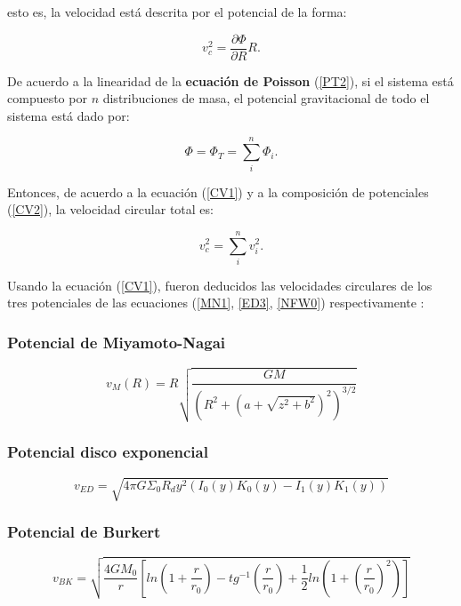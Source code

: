 esto es, la velocidad está descrita por el potencial de la forma:

\begin{equation}
\label{CV1}
v_{c}^2 = \frac{\partial \Phi}{\partial R} R.
\end{equation}

De acuerdo a la linearidad de la \textbf{ecuación de Poisson} (\ref{PT2}), si el sistema está compuesto por $n$ distribuciones de masa, el potencial gravitacional de todo el sistema está dado por:

\begin{equation}
\label{CV2}
 \Phi = \Phi_T = \sum_i^n \Phi_i.
\end{equation}

Entonces, de acuerdo a la ecuación (\ref{CV1}) y  a la composición de potenciales (\ref{CV2}), la velocidad circular total es:

\begin{equation}
\label{CV3}
v_{c}^2 = \sum_i^n v_i^2.
\end{equation}

Usando la ecuación (\ref{CV1}), fueron deducidos las velocidades circulares de los tres potenciales de las ecuaciones (\ref{MN1}, \ref{ED3}, \ref{NFW0}) respectivamente \cite{BT}:

\subsubsection{Potencial de Miyamoto-Nagai}
\begin{equation}
v_M (R) = R \sqrt{ \frac{GM}{ (R^2+(a+\sqrt{z^2+b^2})^2)^{3/2}}  }
\end{equation}

\subsubsection{Potencial disco exponencial}
\begin{equation}
v_{ED} = \sqrt{ 4\pi G \Sigma_0 R_d y^2 (I_0(y)K_0(y) - I_1(y)K_1(y)) }
\end{equation}

\subsubsection{Potencial de Burkert}
\begin{equation}
v_{BK} = \sqrt{ \frac{4GM_0}{r}  \left [ ln \left (1+\frac{r}{r_0} \right ) - tg^{-1} \left (\frac{r}{r_0} \right ) +\frac{1}{2} ln \left ( 1+\left (\frac{r}{r_0} \right )^2\right ) \right ] }
\end{equation}

